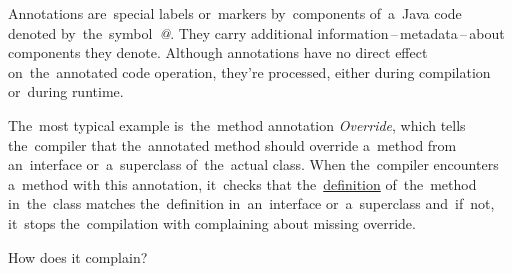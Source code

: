 
\label{javaannotation}
Annotations are~special labels or~markers by~components of~a~Java code denoted by~the~symbol~\textquotesingle\textit{@}\textquotesingle. They carry additional information\,--\,metadata\,--\,about components they denote. Although annotations have no direct effect on~the~annotated code operation, they're processed, either during compilation or~during runtime.

The~most typical example is~the~method annotation \textit{Override}, which tells the~compiler that the~annotated method should override a~method from an~interface or~a~superclass of~the~actual class. When the~compiler encounters a~method with this annotation, it~checks that the~\hyperref[definitiondeclaration]{definition} of~the~method in~the~class matches the~definition in~an~interface or~a~superclass and~if~not, it~stops the~compilation with complaining about missing override.

\todo How does it complain?

\label{annotationsrepeatable}


\label{reflection}